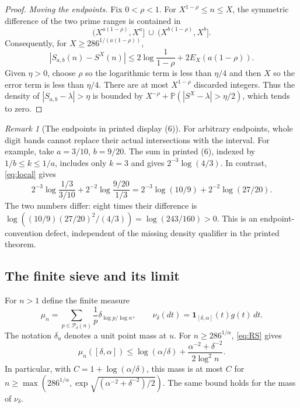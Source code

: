 \documentclass[10pt]{article}
\theoremstyle{remark}
\newtheorem{remark}[theorem]{Remark}
\newcommand{\Prob}{\mathbb P}
\newcommand{\ind}{\mathbf 1}
\begin{document}
\begin{proof}
\emph{Moving the endpoints.} Fix $0<\rho<1$. For
$X^{1-\rho}\leq n\leq X$, the symmetric difference of the two prime
ranges is contained in
\[
 (X^{a(1-\rho)},X^a]\ \cup\ (X^{b(1-\rho)},X^b].
\]
Consequently, for $X\geq286^{1/(a(1-\rho))}$,
\begin{equation}\label{eq:endpointshift}
 |S_{a,b}(n)-S^X(n)|\leq
 2\log\frac1{1-\rho}+2E_X(a(1-\rho)).
\end{equation}
Given $\eta>0$, choose $\rho$ so the logarithmic term is less than
$\eta/4$ and then $X$ so the error term is less than $\eta/4$.
There are at most $X^{1-\rho}$ discarded integers. Thus the density
of $|S_{a,b}-\lambda|>\eta$ is bounded by
$X^{-\rho}+\Prob(|S^X-\lambda|>\eta/2)$, which tends to zero.
\end{proof}

\begin{remark}[The endpoints in printed display (6)]\label{rem:printed6}
For arbitrary endpoints, whole digit bands cannot replace their actual
intersections with the interval. For example, take $a=3/10$, $b=9/20$.
The sum in printed (6), indexed by $1/b\leq k\leq1/a$, includes only
$k=3$ and gives $2^{-3}\log(4/3)$. In contrast, \eqref{eq:local} gives
\[
 2^{-3}\log\frac{1/3}{3/10}
 +2^{-2}\log\frac{9/20}{1/3}
 =2^{-3}\log(10/9)+2^{-2}\log(27/20).
\]
The two numbers differ: eight times their difference is
$\log((10/9)(27/20)^2/(4/3))=\log(243/160)>0$.
This is an endpoint-convention defect, independent of the missing
density qualifier in the printed theorem.
\end{remark}

\subsection{The finite sieve and its limit}\label{subsec:sieve}
For $n>1$ define the finite measure
\[
 \mu_n=\sum_{p\in\mathcal P_\delta(n)}\frac1p
             \delta_{\log p/\log n},\qquad
 \nu_\delta(dt)=\ind_{[\delta,\alpha]}(t)g(t)\,dt.
\]
The notation $\delta_u$ denotes a unit point mass at $u$.
For $n\geq286^{1/\alpha}$, \eqref{eq:RS} gives
\begin{equation}\label{eq:massbound}
 \mu_n([\delta,\alpha])
 \leq\log(\alpha/\delta)
 +\frac{\alpha^{-2}+\delta^{-2}}{2\log^2n}.
\end{equation}
In particular, with $C=1+\log(\alpha/\delta)$, this mass is at most
$C$ for
$n\geq\max(286^{1/\alpha},\exp\sqrt{(\alpha^{-2}+\delta^{-2})/2})$.
The same bound holds for the mass of $\nu_\delta$.
\end{document}
